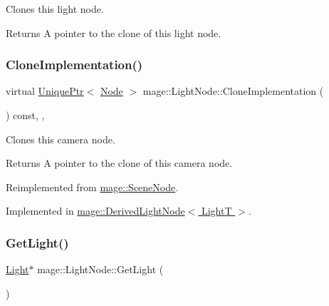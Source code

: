 Clones this light node.

\begin{DoxyReturn}{Returns}
A pointer to the clone of this light node. 
\end{DoxyReturn}
\hypertarget{classmage_1_1_light_node_aea97601d0a4b8073a1c655ca334af242}{}\label{classmage_1_1_light_node_aea97601d0a4b8073a1c655ca334af242} 
\subsubsection{\texorpdfstring{Clone\+Implementation()}{CloneImplementation()}}
{\footnotesize\ttfamily virtual \hyperlink{namespacemage_a3316d7143a973e37adf1110f2e80ca31}{Unique\+Ptr}$<$ \hyperlink{classmage_1_1_node}{Node} $>$ mage\+::\+Light\+Node\+::\+Clone\+Implementation (\begin{DoxyParamCaption}{ }\end{DoxyParamCaption}) const\hspace{0.3cm}{\ttfamily [override]}, {\ttfamily [private]}, {}}

Clones this camera node.

\begin{DoxyReturn}{Returns}
A pointer to the clone of this camera node. 
\end{DoxyReturn}


Reimplemented from \hyperlink{classmage_1_1_scene_node_a42d0d53ab804d38ebd584d2de6490eeb}{mage\+::\+Scene\+Node}.



Implemented in \hyperlink{classmage_1_1_derived_light_node_acf8858989780bf45a45c55a7c5564314}{mage\+::\+Derived\+Light\+Node$<$ Light\+T $>$}.

\hypertarget{classmage_1_1_light_node_a2b971e64ec2267d49c2ba96a00662d3b}{}\label{classmage_1_1_light_node_a2b971e64ec2267d49c2ba96a00662d3b} 
\subsubsection{\texorpdfstring{Get\+Light()}{GetLight()}\hspace{0.1cm}{\footnotesize\ttfamily [1/2]}}
{\footnotesize\ttfamily \hyperlink{classmage_1_1_light}{Light}$\ast$ mage\+::\+Light\+Node\+::\+Get\+Light (\begin{DoxyParamCaption}{ }\end{DoxyParamCaption})\hspace{0.3cm}{\ttfamily [noexcept]}}

